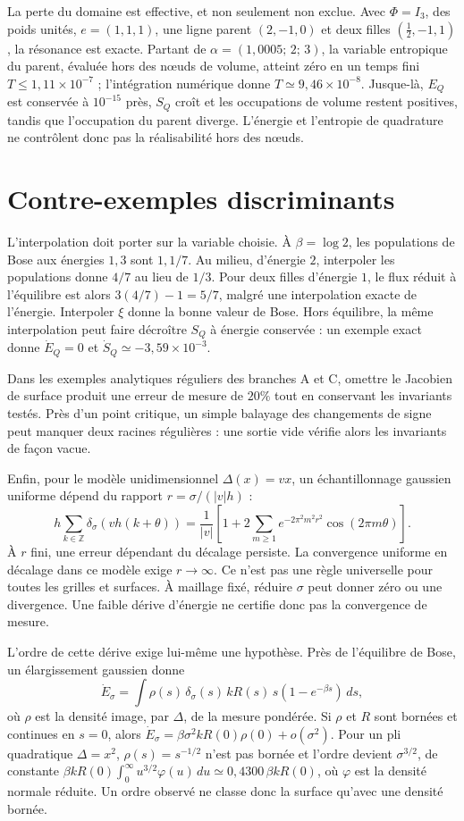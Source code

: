 \documentclass[11pt,a4paper]{article}
\begin{document}
La perte du domaine est effective, et non seulement non exclue.
Avec $\Phi=I_3$, des poids unités, $e=(1,1,1)$, une ligne parent
$(2,-1,0)$ et deux filles $(\tfrac12,-1,1)$, la résonance est exacte.
Partant de $\alpha=(1{,}0005;\,2;\,3)$, la variable entropique du parent,
évaluée hors des nœuds de volume, atteint zéro en un temps fini
$T\le1{,}11\times10^{-7}$ ; l'intégration numérique donne
$T\simeq9{,}46\times10^{-8}$. Jusque-là, $E_Q$ est conservée à
$10^{-15}$ près, $S_Q$ croît et les occupations de volume restent
positives, tandis que l'occupation du parent diverge. L'énergie et
l'entropie de quadrature ne contrôlent donc pas la réalisabilité
hors des nœuds.

\section{Contre-exemples discriminants}
L'interpolation doit porter sur la variable choisie.
À $\beta=\log2$, les populations de Bose aux énergies $1,3$
sont $1,1/7$. Au milieu, d'énergie $2$, interpoler les populations
donne $4/7$ au lieu de $1/3$. Pour deux filles d'énergie $1$,
le flux réduit à l'équilibre est alors
$3(4/7)-1=5/7$, malgré une interpolation exacte de l'énergie.
Interpoler $\xi$ donne la bonne valeur de Bose.
Hors équilibre, la même interpolation peut faire décroître $S_Q$ à
énergie conservée : un exemple exact donne $\dot E_Q=0$ et
$\dot S_Q\simeq-3{,}59\times10^{-3}$.

Dans les exemples analytiques réguliers des branches A et C,
omettre le Jacobien de surface produit une erreur de mesure de
$20\%$ tout en conservant les invariants testés.
Près d'un point critique, un simple balayage des changements de signe
peut manquer deux racines régulières : une sortie vide vérifie alors
les invariants de façon vacue.

Enfin, pour le modèle unidimensionnel $\Delta(x)=vx$, un échantillonnage
gaussien uniforme dépend du rapport $r=\sigma/(|v|h)$ :
\[
 h\sum_{k\in\mathbb Z}\delta_\sigma(vh(k+\theta))
 =\frac{1}{|v|}
  \left[1+2\sum_{m\ge1}e^{-2\pi^2m^2r^2}\cos(2\pi m\theta)\right].
\]
À $r$ fini, une erreur dépendant du décalage persiste.
La convergence uniforme en décalage dans ce modèle exige $r\to\infty$.
Ce n'est pas une règle universelle pour toutes les grilles et surfaces.
À maillage fixé, réduire $\sigma$ peut donner zéro ou une divergence.
Une faible dérive d'énergie ne certifie donc pas la convergence de mesure.

L'ordre de cette dérive exige lui-même une hypothèse. Près de
l'équilibre de Bose, un élargissement gaussien donne
\[
 \dot E_\sigma=\int\rho(s)\,\delta_\sigma(s)\,kR(s)\,s(1-e^{-\beta s})\,ds,
\]
où $\rho$ est la densité image, par $\Delta$, de la mesure pondérée.
Si $\rho$ et $R$ sont bornées et continues en $s=0$, alors
$\dot E_\sigma=\beta\sigma^2kR(0)\rho(0)+o(\sigma^2)$.
Pour un pli quadratique $\Delta=x^2$, $\rho(s)=s^{-1/2}$ n'est pas
bornée et l'ordre devient $\sigma^{3/2}$, de constante
$\beta kR(0)\int_0^\infty u^{3/2}\varphi(u)\,du\simeq0{,}4300\,\beta kR(0)$,
où $\varphi$ est la densité normale réduite.
Un ordre observé ne classe donc la surface qu'avec une densité bornée.
\end{document}
